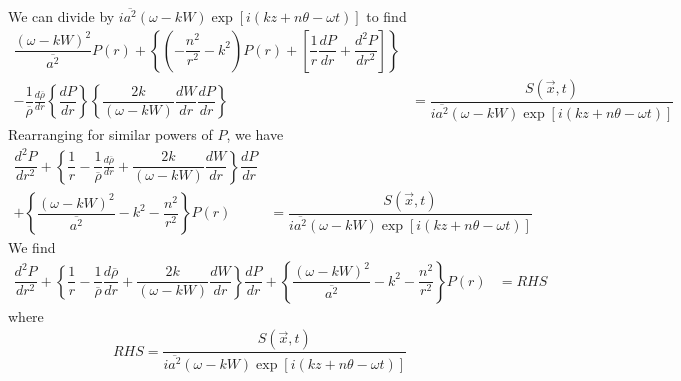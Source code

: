 \documentclass[onecolumn,10pt]{jhwhw}
\begin{document}
We can divide by $i \overline{a^2} \left( \omega - k W \right) \exp[i(kz+n \theta - \omega t)]$ to find
\begin{align*}
\dfrac{\left ( \omega-k W \right)^2}{\overline{a^2} } P(r) + \left \{ \left ( -\dfrac{n^2}{r^2} -k^2 \right ) P(r) + \left [ \dfrac{1}{r} \dfrac{d P} {d r} + \dfrac{d^2 P} {d r^2} \right ] \right \} \\
- \dfrac{1}{\overline{\rho}} \frac{d \overline{\rho}}{dr} \left \{ \dfrac{d P}{dr} \right \} \left \{ \dfrac{2 k}{\left ( \omega-k W \right)} \dfrac{dW}{dr} \dfrac{d P}{d r} \right \} &= \dfrac{S(\vec{x}, t)}{i \overline{a^2} \left( \omega - k W \right) \exp[i(kz+n \theta - \omega t)]}
\end{align*}
Rearranging for similar powers of $P$, we have
\begin{align*}
\dfrac{d^2 P} {d r^2}
+ \left \{ \dfrac{1}{r} - \dfrac{1}{\overline{\rho}} \frac{d \overline{\rho}}{dr} + \dfrac{2 k}{\left ( \omega-k W \right)} \dfrac{dW}{dr} \right \} \dfrac{d P} {d r} \\
+ \left \{ \dfrac{\left ( \omega-k W \right)^2}{\overline{a^2}} -k^2 -\dfrac{n^2}{r^2} \right \} P(r) &= \dfrac{S(\vec{x}, t)}{i \overline{a^2} \left( \omega - k W \right) \exp[i(kz+n \theta - \omega t)]}
\end{align*}
We find
\begin{align*}
\dfrac{d^2 P} {d r^2} + \left \{ \dfrac{1}{r} - \dfrac{1}{\overline{\rho}} \dfrac{d \overline{\rho}}{dr} + \dfrac{2 k}{\left ( \omega-k W \right)} \dfrac{dW}{dr} \right \} \dfrac{d P} {d r} + \left \{ \dfrac{\left ( \omega-k W \right)^2}{\overline{a^2}} -k^2 -\dfrac{n^2}{r^2} \right \} P(r) &= RHS
\end{align*}
where
\begin{align*}
RHS = \dfrac{S(\vec{x}, t)}{i \overline{a^2} \left( \omega - k W \right) \exp[i(kz+n \theta - \omega t)]}
\end{align*}
\end{document}
